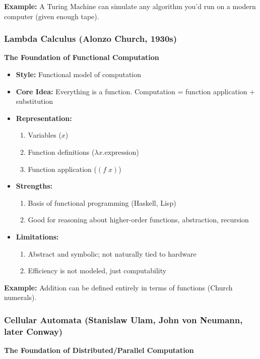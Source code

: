 \textbf{Example:} A Turing Machine can simulate any algorithm you'd run on a modern computer (given enough tape).

\subsubsection{Lambda Calculus (Alonzo Church, 1930s)}
\label{subsubsec:lambda-calculus}

\textbf{The Foundation of Functional Computation}

\begin{itemize}
\item \textbf{Style:} Functional model of computation
\item \textbf{Core Idea:} Everything is a function. Computation = function application + substitution
\item \textbf{Representation:}
\begin{enumerate}
\item Variables ($x$)
\item Function definitions ($\lambda x. \text{expression}$)
\item Function application ($(f \; x)$)
\end{enumerate}
\item \textbf{Strengths:}
\begin{enumerate}
\item Basis of functional programming (Haskell, Lisp)
\item Good for reasoning about higher-order functions, abstraction, recursion
\end{enumerate}
\item \textbf{Limitations:}
\begin{enumerate}
\item Abstract and symbolic; not naturally tied to hardware
\item Efficiency is not modeled, just computability
\end{enumerate}
\end{itemize}

\textbf{Example:} Addition can be defined entirely in terms of functions (Church numerals).

\subsubsection{Cellular Automata (Stanislaw Ulam, John von Neumann, later Conway)}
\label{subsubsec:cellular-automata}

\textbf{The Foundation of Distributed/Parallel Computation}

